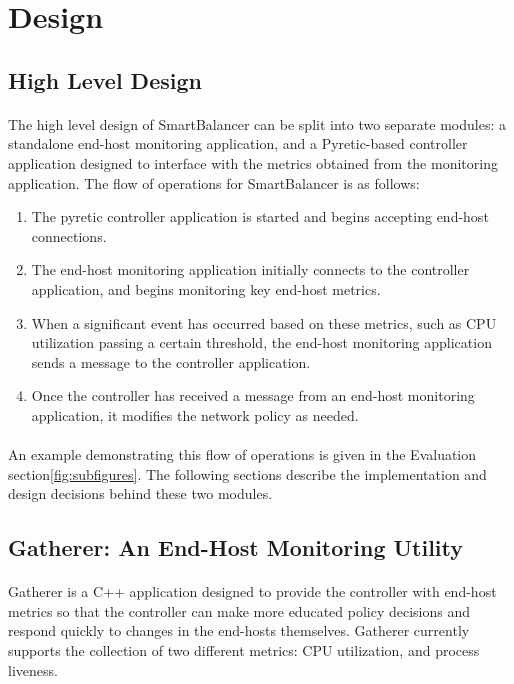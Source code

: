 \documentclass[10pt]{article}
\begin{document}
\section{Design}
\label{sec:design}

\subsection{High Level Design}

\paragraph{} The high level design of SmartBalancer can be split into two separate modules: a standalone end-host monitoring application, and a Pyretic-based controller application designed to interface with the metrics obtained from the monitoring application.  The flow of operations for SmartBalancer is as follows:
\begin{enumerate}
\item The pyretic controller application is started and begins accepting end-host connections.
\item The end-host monitoring application initially connects to the controller application, and begins monitoring key end-host metrics.
\item When a significant event has occurred based on these metrics, such as CPU utilization passing a certain threshold, the end-host monitoring application sends a message to the controller application.
\item Once the controller has received a message from an end-host monitoring application, it modifies the network policy as needed.
\end{enumerate}

\paragraph{} An example demonstrating this flow of operations is given in the Evaluation section\ref{fig:subfigures}. The following sections describe the implementation and design decisions behind these two modules.

\subsection{Gatherer: An End-Host Monitoring Utility}

\paragraph{} Gatherer is a C++ application designed to provide the controller with end-host metrics so that the controller can make more educated policy decisions and respond quickly to changes in the end-hosts themselves. Gatherer currently supports the collection of two different metrics: CPU utilization, and process liveness.
\end{document}
